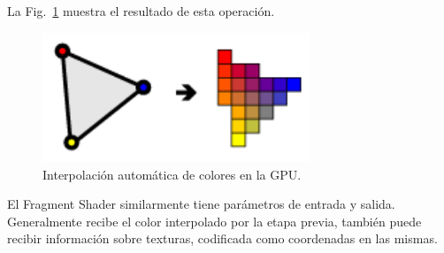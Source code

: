 La Fig.~\ref{fg:interpolation} muestra el resultado de esta operación.

\begin{figure}[h]
\begin{center}
\includegraphics[width=8cm]{figures/interpolation}
\end{center}
\caption{Interpolación automática de colores en la GPU.}
\label{fg:interpolation}
\end{figure}






El Fragment Shader similarmente tiene par\'ametros de entrada y salida. Generalmente recibe el color interpolado por la etapa previa, tambi\'en puede recibir informaci\'on sobre texturas, codificada como coordenadas en las mismas. 



